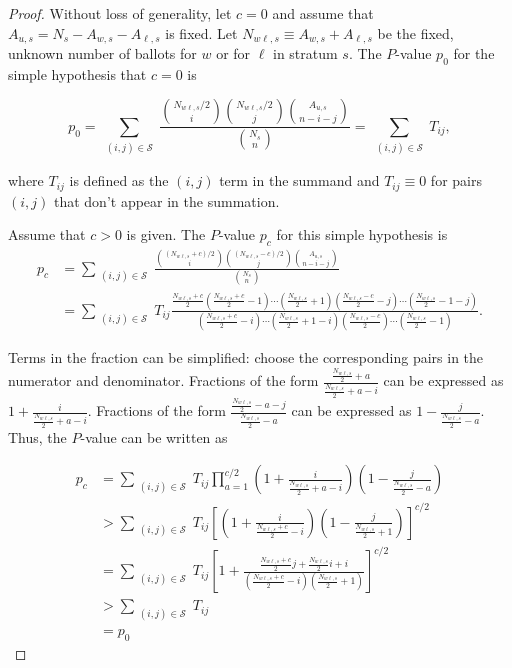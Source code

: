 \documentclass[runningheads]{llncs}
\begin{document}
\begin{proof}
Without loss of generality, let $c=0$ and assume that $A_{u,s}=N_s - A_{w,s} - A_{\ell,s}$ is fixed.
Let $N_{w\ell, s} \equiv A_{w,s}+A_{\ell,s}$ be the fixed, unknown number of ballots for $w$ or for $\ell$ in stratum $s$.
The $P$-value $p_0$ for the simple hypothesis that $c=0$ is

\begin{equation}
  p_0 = \sum_{\substack{(i, j) \in \mathcal{S}}} \frac{ {N_{w\ell, s}/2 \choose i}{N_{w\ell, s}/2 \choose j}{A_{u,s} \choose n-i-j}}{{N_s \choose n}} =  \sum_{\substack{(i, j) \in \mathcal{S}}}T_{ij},
\end{equation}

\noindent where $T_{ij}$ is defined as the $(i, j)$ term in the summand and $T_{ij} \equiv 0$ for pairs $(i, j)$ that don't appear in the summation.

Assume that $c>0$ is given.
The $P$-value $p_c$ for this simple hypothesis is
\begin{align*}
p_c &=   \sum_{\substack{(i, j) \in \mathcal{S}}}  \frac{ {(N_{w\ell, s}+c)/2 \choose i}{(N_{w\ell, s}-c)/2 \choose j}{A_{u,s} \choose n-i-j}}{{N_s \choose n}}  \\
   &=\sum_{\substack{(i, j) \in \mathcal{S}}} T_{ij} \frac{ \frac{N_{w\ell, s}+c}{2}(\frac{N_{w\ell, s}+c}{2}-1)\cdots(\frac{N_{w\ell, s}}{2}+1) (\frac{N_{w\ell, s}-c}{2} -j)\cdots(\frac{N_{w\ell, s}}{2}-1-j) }
   {(\frac{N_{w\ell, s}+c}{2} -i)\cdots(\frac{N_{w\ell, s}}{2}+1-i)(\frac{N_{w\ell, s}-c}{2})\cdots(\frac{N_{w\ell, s}}{2}-1)}.
\end{align*}

Terms in the fraction can be simplified: choose the corresponding pairs in the numerator and denominator.
Fractions of the form $\frac{\frac{N_{w\ell, s}}{2} + a}{\frac{N_{w\ell,s}}{2} + a - i}$ can be expressed as $1 + \frac{i}{\frac{N_{w\ell,s}}{2} + a-i}$.
Fractions of the form $\frac{\frac{N_{w\ell, s}}{2}  - a - j}{\frac{N_{w\ell, s}}{2}  - a}$ can be expressed as $1 - \frac{j}{\frac{N_{w\ell, s}}{2} -a}$.
Thus, the $P$-value can be written as 

\begin{align*}
p_c &= \sum_{\substack{(i, j) \in \mathcal{S}}} T_{ij} \prod_{a=1}^{c/2} \left(1 + \frac{i}{\frac{N_{w\ell,s}}{2} + a-i}\right)\left(1 - \frac{j}{\frac{N_{w\ell, s}}{2} - a}\right) \\
&> \sum_{\substack{(i, j) \in \mathcal{S}}}  T_{ij} \left[ \left(1 + \frac{i}{\frac{N_{w\ell,s}+c}{2} -i}\right)\left(1 - \frac{j}{\frac{N_{w\ell, s}}{2}+1}\right) \right]^{c/2} \\
&= \sum_{\substack{(i, j) \in \mathcal{S}}} T_{ij} \left[ 1 + \frac{\frac{N_{w\ell,s}+c}{2}j + \frac{N_{w\ell,s}}{2}i + i}{(\frac{N_{w\ell,s}+c}{2}-i)(\frac{N_{w\ell,s}}{2}+1)}\right]^{c/2} \\
&> \sum_{\substack{(i, j) \in \mathcal{S}}}  T_{ij}\\
&= p_0
\end{align*}


\end{proof}
\end{document}
